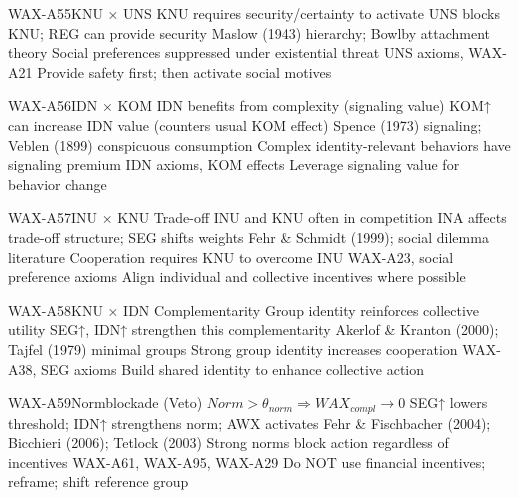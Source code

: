 \begin{axiomspec}{WAX-A55}{KNU × UNS}
 KNU requires security/certainty to activate
 UNS blocks KNU; REG can provide security
 Maslow (1943) hierarchy; Bowlby attachment theory
 Social preferences suppressed under existential threat
 UNS axioms, WAX-A21
 Provide safety first; then activate social motives
\end{axiomspec}

\begin{axiomspec}{WAX-A56}{IDN × KOM}
 IDN benefits from complexity (signaling value)
 KOM↑ can increase IDN value (counters usual KOM effect)
 Spence (1973) signaling; Veblen (1899) conspicuous consumption
 Complex identity-relevant behaviors have signaling premium
 IDN axioms, KOM effects
 Leverage signaling value for behavior change
\end{axiomspec}

\begin{axiomspec}{WAX-A57}{INU × KNU Trade-off}
 INU and KNU often in competition
 INA affects trade-off structure; SEG shifts weights
 Fehr \& Schmidt (1999); social dilemma literature
 Cooperation requires KNU to overcome INU
 WAX-A23, social preference axioms
 Align individual and collective incentives where possible
\end{axiomspec}

\begin{axiomspec}{WAX-A58}{KNU × IDN Complementarity}
 Group identity reinforces collective utility
 SEG↑, IDN↑ strengthen this complementarity
 Akerlof \& Kranton (2000); Tajfel (1979) minimal groups
 Strong group identity increases cooperation
 WAX-A38, SEG axioms
 Build shared identity to enhance collective action
\end{axiomspec}

\begin{axiomspec}{WAX-A59}{Normblockade (Veto)}
 $Norm > \theta_{norm} \Rightarrow WAX_{compl} \rightarrow 0$
 SEG↑ lowers threshold; IDN↑ strengthens norm; AWX activates
 Fehr \& Fischbacher (2004); Bicchieri (2006); Tetlock (2003)
 Strong norms block action regardless of incentives
 WAX-A61, WAX-A95, WAX-A29
 Do NOT use financial incentives; reframe; shift reference group
\end{axiomspec}

